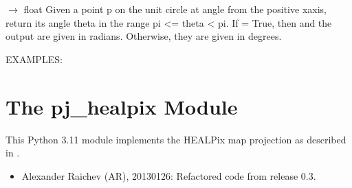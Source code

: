 \documentclass[a4paper,12ptopenany,oneside,english]{sphinxmanual}
\begin{document}

\begin{fulllineitems}
\label{\detokenize{utils:rhealpixdggs.utils.wrap_longitude}}
\pysigstartsignatures
\pysiglinewithargsret
{}
{\sphinxparamcomma {}}
{{ $\rightarrow$ float}}
\pysigstopsignatures
\sphinxAtStartPar
Given a point p on the unit circle at angle  from the positive
x\sphinxhyphen{}axis, return its angle theta in the range \sphinxhyphen{}pi \textless{}= theta \textless{} pi.
If  = True, then  and the output are given in radians.
Otherwise, they are given in degrees.

\sphinxAtStartPar
EXAMPLES:

\begin{sphinxVerbatim}[commandchars=\\\{\}]
   
\end{sphinxVerbatim}

\end{fulllineitems}


\sphinxstepscope


\chapter{The pj\_healpix Module}
\label{\detokenize{pj_healpix:module-rhealpixdggs.pj_healpix}}\label{\detokenize{pj_healpix:the-pj-healpix-module}}\label{\detokenize{pj_healpix::doc}}
\sphinxAtStartPar
This Python 3.11 module implements the HEALPix map projection as described in .
\begin{itemize}
\item {} 
\sphinxAtStartPar
Alexander Raichev (AR), 2013\sphinxhyphen{}01\sphinxhyphen{}26: Refactored code from release 0.3.

\end{itemize}
\end{document}
